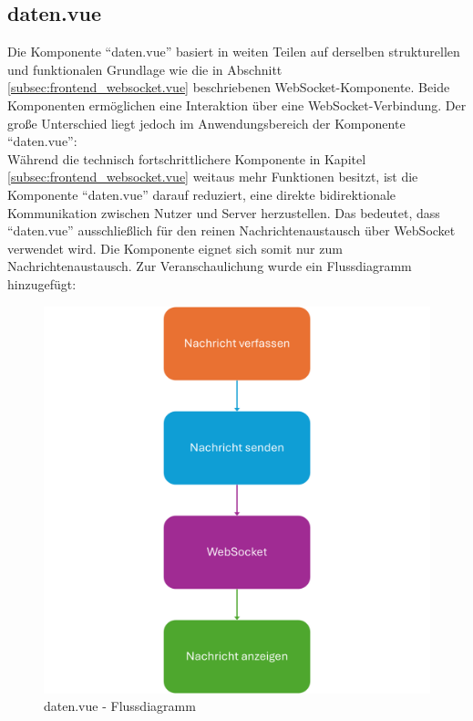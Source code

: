 \subsection{daten.vue}
\label{subsec:frontend_daten.vue}
Die Komponente ``daten.vue'' basiert in weiten Teilen auf derselben strukturellen 
und funktionalen Grundlage wie die in Abschnitt \ref{subsec:frontend_websocket.vue} beschriebenen
WebSocket-Komponente. 
%
Beide Komponenten ermöglichen eine Interaktion über eine WebSocket-Verbindung.
%
Der große Unterschied liegt jedoch im Anwendungsbereich der Komponente 
``daten.vue'':\\
Während die technisch fortschrittlichere Komponente in Kapitel \ref{subsec:frontend_websocket.vue} 
weitaus mehr Funktionen besitzt,
ist die Komponente ``daten.vue'' darauf reduziert, 
eine direkte bidirektionale Kommunikation zwischen Nutzer und Server herzustellen.
%
Das bedeutet, dass ``daten.vue'' ausschließlich für den reinen Nachrichtenaustausch über
WebSocket verwendet wird. 
Die Komponente eignet sich somit nur zum Nachrichtenaustausch.
%
Zur Veranschaulichung wurde ein Flussdiagramm hinzugefügt:
\begin{figure}[H]
  \includegraphics[width=\textwidth, center]{img/Daten_FD.png}
  \caption{daten.vue - Flussdiagramm}
  \label{fig:daten_Flowchart}
\end{figure}


